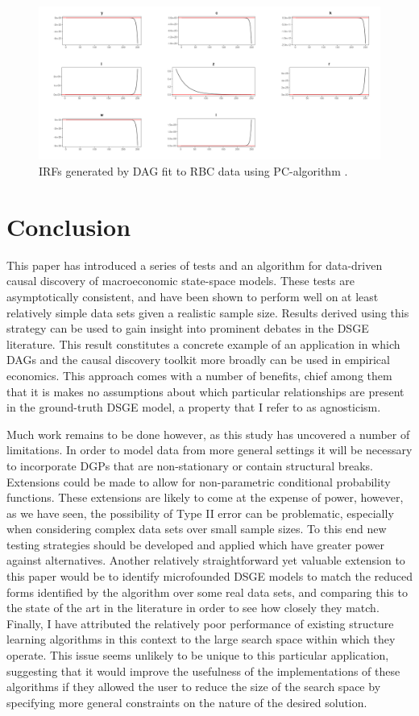 \documentclass{article}
\begin{document}
\begin{figure}
  \centering
  \includegraphics[width=0.8\linewidth]{images/rbc_constraint_irf.png}
  \caption{IRFs generated by DAG fit to RBC data using PC-algorithm \parencite{kalisch2007estimating}.}
  \label{pcirf}
\end{figure}

\section{Conclusion} \label{conclusion}

This paper has introduced a series of tests and an algorithm for data-driven causal discovery of macroeconomic state-space models. These tests are asymptotically consistent, and have been shown to perform well on at least relatively simple data sets given a realistic sample size. Results derived using this strategy can be used to gain insight into prominent debates in the DSGE literature. This result constitutes a concrete example of an application in which DAGs and the causal discovery toolkit more broadly can be used in empirical economics. This approach comes with a number of benefits, chief among them that it is makes no assumptions about which particular relationships are present in the ground-truth DSGE model, a property that I refer to as agnosticism.

Much work remains to be done however, as this study has uncovered a number of limitations. In order to model data from more general settings it will be necessary to incorporate DGPs that are non-stationary or contain structural breaks. Extensions could be made to allow for non-parametric conditional probability functions. These extensions are likely to come at the expense of power, however, as we have seen, the possibility of Type II error can be problematic, especially when considering complex data sets over small sample sizes. To this end new testing strategies should be developed and applied which have greater power against alternatives. Another relatively straightforward yet valuable extension to this paper would be to identify microfounded DSGE models to match the reduced forms identified by the algorithm over some real data sets, and comparing this to the state of the art in the literature in order to see how closely they match. Finally, I have attributed the relatively poor performance of existing structure learning algorithms in this context to the large search space within which they operate. This issue seems unlikely to be unique to this particular application, suggesting that it would improve the usefulness of the implementations of these algorithms if they allowed the user to reduce the size of the search space by specifying more general constraints on the nature of the desired solution.
\end{document}
